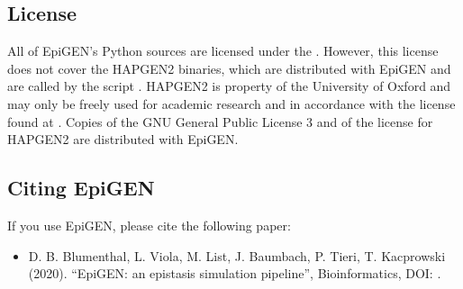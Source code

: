 \documentclass[a4paper,10pt,english]{sphinxhowto}
\begin{document}
\subsection{License}
\label{\detokenize{README:license}}
All of EpiGEN’s Python sources are licensed under the . However, this license does not cover the HAPGEN2 binaries, which are distributed with EpiGEN and are called by the script . HAPGEN2 is property of the University of Oxford and may only be freely used for academic research and in accordance with the license found at . Copies of the GNU General Public License 3 and of the license for HAPGEN2 are distributed with EpiGEN.


\subsection{Citing EpiGEN}
\label{\detokenize{README:citing-epigen}}
If you use EpiGEN, please cite the following paper:
\begin{itemize}
\item {} 
D. B. Blumenthal, L. Viola, M. List, J. Baumbach, P. Tieri, T. Kacprowski (2020). “EpiGEN: an epistasis simulation pipeline”, Bioinformatics, DOI: .

\end{itemize}
\end{document}
